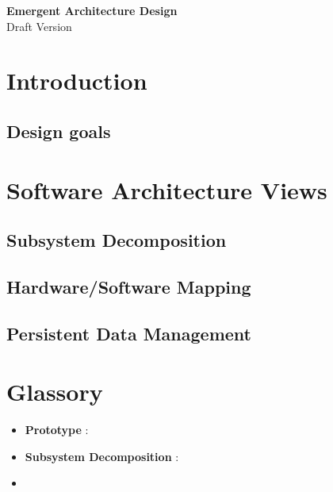\documentclass{article}
\begin{document}
\begin{minipage}[H]{\textwidth}
\vspace{0.3cm}
		\begin{center}
		  \vspace{0.3cm}
		  \Huge{\textbf{Emergent Architecture Design}}\\
		  \huge{Draft Version}
	      \vspace{0.3cm}	
   		  \vspace{0.7cm}	
		\end{center}
	\end{minipage}
\tableofcontents
\newpage
	\section{Introduction}
	
	 \subsection{Design goals}
	 
	 \section{Software Architecture Views}
	 \subsection{Subsystem Decomposition} 
	 
	 \subsection{Hardware/Software Mapping} 
	 
	 \subsection{Persistent Data Management} 
	 

	\section{Glassory}

	\begin{itemize}
		\item \textbf{Prototype} : 
		\item \textbf{Subsystem Decomposition} :
		\item \textbf{}
	\end{itemize}


	
\end{document}
